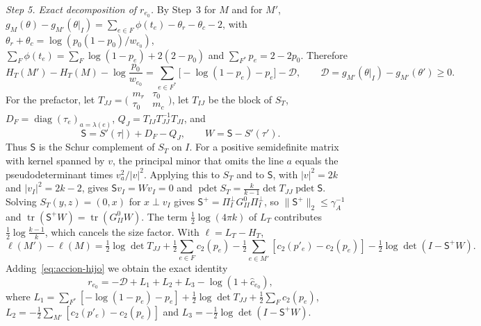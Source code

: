 
\emph{Step 5. Exact decomposition of $r_{e_0}$.} By Step~3 for $M$ and for $M'$,
$g_M(\theta)-g_{M'}(\theta|_I)=\sum_{e\in F}\phi(t_e)-\theta_r-\theta_c-2$, with
$\theta_r+\theta_c=\log(p_0(1-p_0)/w_{e_0})$, $\sum_F\phi(t_e)=\sum_F\log(1-p_e)+2(2-p_0)$ and
$\sum_{F^*}p_e=2-2p_0$. Therefore
\begin{equation}\label{eq:accion-hijo}
 H_T(M')-H_T(M)-\log\frac{p_0}{w_{e_0}}=\sum_{e\in F^*}\bigl[-\log(1-p_e)-p_e\bigr]-\mathcal D,\qquad
 \mathcal D=g_{M'}(\theta|_I)-g_{M'}(\theta')\ge0 .
\end{equation}
For the prefactor, let $T_{JJ}=\bigl(\begin{smallmatrix}m_r&\tau_0\\ \tau_0&m_c\end{smallmatrix}\bigr)$,
let $T_{IJ}$ be the block of $S_T$, $D_F=\operatorname{diag}(\tau_e)_{a=\lambda(e)}$,
$Q_J=T_{IJ}T_{JJ}^{-1}T_{JI}$, and
\[
 \mathsf S=S'(\tau|)+D_F-Q_J,\qquad W=\mathsf S-S'(\tau') .
\]
Thus $\mathsf S$ is the Schur complement of $S_T$ on $I$. For a positive semidefinite matrix with kernel
spanned by $v$, the principal minor that omits the line $a$ equals the pseudodeterminant times
$v_a^2/|v|^2$. Applying this to $S_T$ and to $\mathsf S$, with $|v|^2=2k$ and $|v_I|^2=2k-2$, gives
$\mathsf Sv_I=Wv_I=0$ and $\operatorname{pdet}S_T=\tfrac k{k-1}\det T_{JJ}\operatorname{pdet}\mathsf S$.
Solving $S_T(y,z)=(0,x)$ for $x\perp v_I$ gives $\mathsf S^+=\Pi_I^\perp G^0_{II}\Pi_I^\perp$, so
$\|\mathsf S^+\|_2\le\gamma_A^{-1}$ and $\operatorname{tr}(\mathsf S^+W)=\operatorname{tr}(G^0_{II}W)$.
The term $\tfrac12\log(4\pi k)$ of $L_T$ contributes $\tfrac12\log\tfrac{k-1}k$, which cancels the size
factor. With $\ell=L_T-H_T$,
\[
 \ell(M')-\ell(M)=\tfrac12\log\det T_{JJ}+\tfrac12\sum_{e\in F}c_2(p_e)
   -\tfrac12\sum_{e\in M'}[c_2(p'_e)-c_2(p_e)]-\tfrac12\log\det(I-\mathsf S^+W).
\]
Adding~\eqref{eq:accion-hijo} we obtain the exact identity
\begin{equation}\label{eq:re-exacto}
 r_{e_0}=-\mathcal D+L_1+L_2+L_3-\log(1+\hat c_{e_0}),
\end{equation}
where $L_1=\sum_{F^*}[-\log(1-p_e)-p_e]+\tfrac12\log\det T_{JJ}+\tfrac12\sum_Fc_2(p_e)$,
$L_2=-\tfrac12\sum_{M'}[c_2(p'_e)-c_2(p_e)]$ and $L_3=-\tfrac12\log\det(I-\mathsf S^+W)$.

